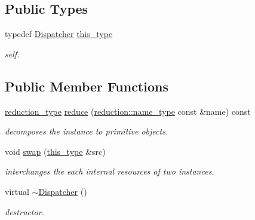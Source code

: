 \subsection*{Public Types}
\begin{DoxyCompactItemize}
\item 
\hypertarget{classhryky_1_1reduction_1_1_dispatcher_a8a3ef8b3aa55fc7139de687a9be4f693}{typedef \hyperlink{classhryky_1_1reduction_1_1_dispatcher}{Dispatcher} \hyperlink{classhryky_1_1reduction_1_1_dispatcher_a8a3ef8b3aa55fc7139de687a9be4f693}{this\-\_\-type}}\label{classhryky_1_1reduction_1_1_dispatcher_a8a3ef8b3aa55fc7139de687a9be4f693}

\begin{DoxyCompactList}\small\item\em self. \end{DoxyCompactList}\end{DoxyCompactItemize}
\subsection*{Public Member Functions}
\begin{DoxyCompactItemize}
\item 
\hypertarget{classhryky_1_1reduction_1_1_dispatcher_a776eb4999cca982ff8220cdd4a247685}{\hyperlink{namespacehryky_a343a9a4c36a586be5c2693156200eadc}{reduction\-\_\-type} \hyperlink{classhryky_1_1reduction_1_1_dispatcher_a776eb4999cca982ff8220cdd4a247685}{reduce} (\hyperlink{namespacehryky_1_1reduction_ac686c30a4c8d196bbd0f05629a6b921f}{reduction\-::name\-\_\-type} const \&name) const }\label{classhryky_1_1reduction_1_1_dispatcher_a776eb4999cca982ff8220cdd4a247685}

\begin{DoxyCompactList}\small\item\em decomposes the instance to primitive objects. \end{DoxyCompactList}\item 
\hypertarget{classhryky_1_1reduction_1_1_dispatcher_a04c37d34d2599e7e5954cb974641e6c7}{void \hyperlink{classhryky_1_1reduction_1_1_dispatcher_a04c37d34d2599e7e5954cb974641e6c7}{swap} (\hyperlink{classhryky_1_1reduction_1_1_dispatcher_a8a3ef8b3aa55fc7139de687a9be4f693}{this\-\_\-type} \&src)}\label{classhryky_1_1reduction_1_1_dispatcher_a04c37d34d2599e7e5954cb974641e6c7}

\begin{DoxyCompactList}\small\item\em interchanges the each internal resources of two instances. \end{DoxyCompactList}\item 
\hypertarget{classhryky_1_1reduction_1_1_dispatcher_a6bc629fb556cf0f771021bb1087474a8}{virtual \hyperlink{classhryky_1_1reduction_1_1_dispatcher_a6bc629fb556cf0f771021bb1087474a8}{$\sim$\-Dispatcher} ()}\label{classhryky_1_1reduction_1_1_dispatcher_a6bc629fb556cf0f771021bb1087474a8}

\begin{DoxyCompactList}\small\item\em destructor. \end{DoxyCompactList}\end{DoxyCompactItemize}
